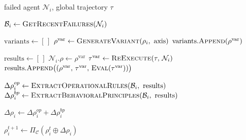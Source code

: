 \begin{algorithm}[H]
\caption{RoPE — Role-aware Prompt Evolution}
\begin{algorithmic}[1]
\Require failed agent $\mathcal{N}_i$, global trajectory $\tau$

\State $\mathcal{B}_i \leftarrow \textsc{GetRecentFailures}(\mathcal{N}_i)$

\State $\text{variants} \leftarrow [\,]$
    \State $\rho^{\text{var}} \leftarrow \textsc{GenerateVariant}(\rho_i,\ \text{axis})$
    \State $\text{variants}.\textsc{Append}(\rho^{\text{var}})$
\EndFor

\State $\text{results} \leftarrow [\,]$
    \State $\mathcal{N}_i.\rho \leftarrow \rho^{\text{var}}$
    \State $\tau^{\text{var}} \leftarrow \textsc{ReExecute}(\tau,\, \mathcal{N}_i)$
    \State $\text{results}.\textsc{Append}\bigl((\rho^{\text{var}},\, \tau^{\text{var}},\, \textsc{Eval}(\tau^{\text{var}}))\bigr)$
\EndFor

\State $\Delta\rho_i^{op} \leftarrow \textsc{ExtractOperationalRules}(\mathcal{B}_i,\ \text{results})$
\State $\Delta\rho_i^{bp} \leftarrow \textsc{ExtractBehavioralPrinciples}(\mathcal{B}_i,\ \text{results})$

\State $\Delta\rho_i \leftarrow \Delta\rho_i^{op} + \Delta\rho_i^{bp}$

\State $\rho_i^{t+1} \leftarrow \Pi_{\mathcal{C}}\!\left(\rho_i^{t} \oplus \Delta\rho_i\right)$
\end{algorithmic}
\end{algorithm}



